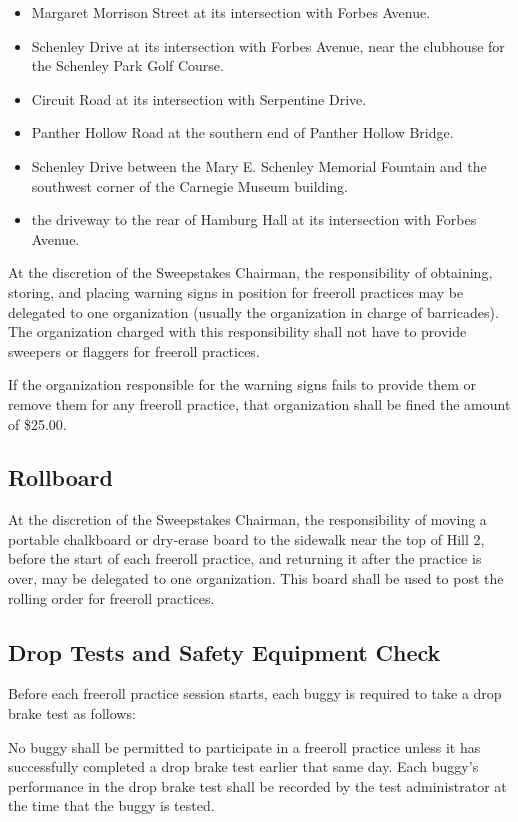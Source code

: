 	\begin{itemize}
		\item Margaret Morrison Street at its intersection with Forbes Avenue.
		\item Schenley Drive at its intersection with Forbes Avenue, near the clubhouse for the Schenley Park Golf Course.
		\item Circuit Road at its intersection with Serpentine Drive.
		\item Panther Hollow Road at the southern end of Panther Hollow Bridge.
		\item Schenley Drive between the Mary E. Schenley Memorial Fountain and the southwest corner of the Carnegie Museum building.
		\item the driveway to the rear of Hamburg Hall at its intersection with Forbes Avenue.
	\end{itemize}

	At the discretion of the Sweepstakes Chairman, the responsibility of obtaining,
	storing, and placing warning signs in position for freeroll practices may be
	delegated to one organization (usually the organization in charge of
	barricades). The organization charged with this responsibility shall not have
	to provide sweepers or flaggers for freeroll practices.

	If the organization responsible for the warning signs fails to provide them or
	remove them for any freeroll practice, that organization shall be fined the
	amount of \$25.00.

\subsection{Rollboard}

	At the discretion of the Sweepstakes Chairman, the responsibility of moving a
	portable chalkboard or dry-erase board to the sidewalk near the top of Hill 2,
	before the start of each freeroll practice, and returning it after the practice
	is over, may be delegated to one organization. This board shall be used to post
	the rolling order for freeroll practices.

\subsection{Drop Tests and Safety Equipment Check}

	Before each freeroll practice session starts, each buggy is required to take a
	drop brake test as follows:

	No buggy shall be permitted to participate in a freeroll practice unless it has
	successfully completed a drop brake test earlier that same day. Each buggy's
	performance in the drop brake test shall be recorded by the test administrator
	at the time that the buggy is tested.

